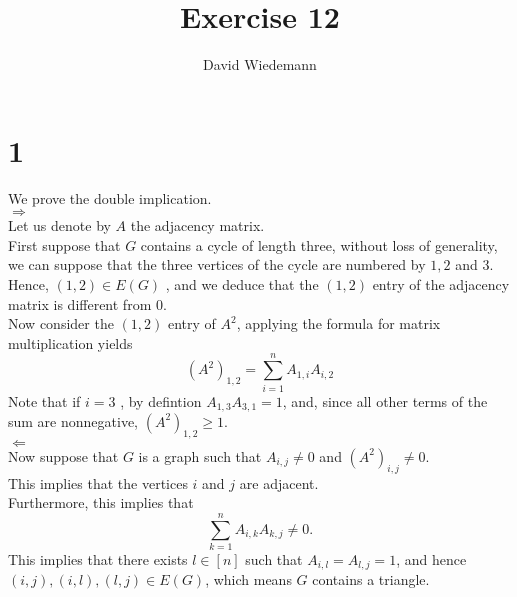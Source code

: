 \documentclass[11pt, a4paper]{article}
\begin{document}
\title{Exercise 12}
\author{David Wiedemann}
\maketitle
\section*{1}
We prove the double implication.\\
$ \Rightarrow $ \\
Let us denote by $A$ the adjacency matrix.\\
First suppose that $G$ contains a cycle of length three, without loss of generality, we can suppose that the three vertices of the cycle are numbered by $1,2$ and $3.$ \\
Hence, $ ( 1,2) \in E( G) $ , and we deduce that the $( 1,2) $ entry of the adjacency matrix is different from 0.\\
Now consider the $( 1,2) $ entry of $A^{2}$, applying the formula for matrix multiplication yields
\[ 
\left( A^{2} \right)_{1,2} = \sum_{i=1}^{ n} A_{1,i} A_{i,2} 
\]
Note that if $i=3$ , by defintion $A_{1,3} A_{3,1} =1$, and, since all other terms of the sum are nonnegative, $ ( A^{2}) _{1,2} \geq 1$.\\
$\Leftarrow$ \\
Now suppose that $G$ is a graph such that $A_{i,j} \neq 0$ and $( A^{2}) _{i,j} \neq 0 $.\\
This implies that the vertices $i $ and $j$ are adjacent.\\
Furthermore, this implies that
\[ 
\sum_{k=1}^{ n}A_{i,k} A_{k,j} \neq 0.
\]
This implies that there exists $l \in [ n] $ such that $A_{i,l} = A_{l,j} = 1$, and hence $ ( i,j) , ( i,l) , ( l,j) \in E( G) $, which means $G$ contains a triangle.
\end{document}
